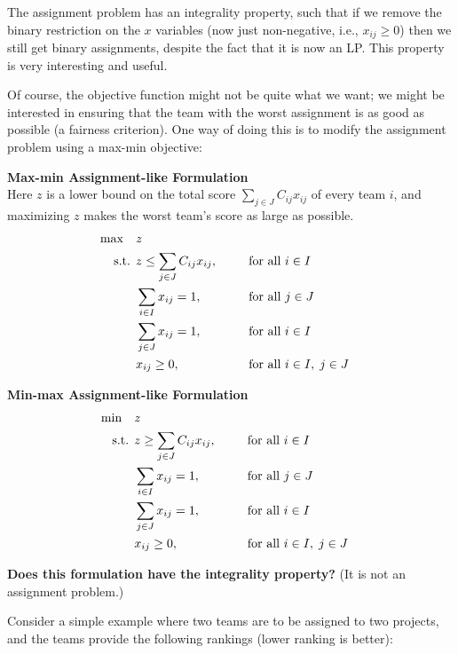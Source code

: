 The assignment problem has an integrality property, such that if we remove the binary restriction on the $x$ variables (now just non-negative, i.e., $x_{ij} \ge 0$) then we still get binary assignments, despite the fact that it is now an LP.  This property is very interesting and useful. 

Of course, the objective function might not be quite what we want; we might be interested in ensuring that the team with the worst assignment is as good as possible (a fairness criterion). One way of doing this is to modify the assignment problem using a max-min objective:

\medskip \textbf{Max-min Assignment-like Formulation} \\
Here $z$ is a lower bound on the total score $\sum_{j \in J} C_{ij} x_{ij}$ of every team $i$, and maximizing $z$ makes the worst team's score as large as possible.
\begin{align*}
\max \quad & z  \nonumber \\
\mbox{ s.t. }        & z \leq \sum_{j \in J} C_{i j} x_{i j},~~ &&\quad \mbox{for all } i \in I \\
   & \sum_{i \in I} x_{i j} = 1,~~ &&\quad \mbox{for all } j \in J \\
         & \sum_{j \in J} x_{i j} = 1,~~ &&\quad \mbox{for all } i \in I \\
         & x_{i j} \ge 0,~~ &&\quad \mbox{for all } i \in I, \; j \in J
\end{align*}

\medskip \textbf{Min-max Assignment-like Formulation} \\
\begin{align*}
\min \quad & z  \nonumber \\
\mbox{ s.t. }        & z \geq \sum_{j \in J} C_{i j} x_{i j},~~ &&\quad \mbox{for all } i \in I \\
   & \sum_{i \in I} x_{i j} = 1,~~ &&\quad \mbox{for all } j \in J \\
         & \sum_{j \in J} x_{i j} = 1,~~ &&\quad \mbox{for all } i \in I \\
         & x_{i j} \ge 0,~~ &&\quad \mbox{for all } i \in I, \; j \in J
\end{align*}

\medskip \textbf{Does this formulation have the integrality property?}  
(It is not an assignment problem.)

Consider a simple example where two teams are to be assigned to two projects, and the teams provide the following rankings (lower ranking is better):

